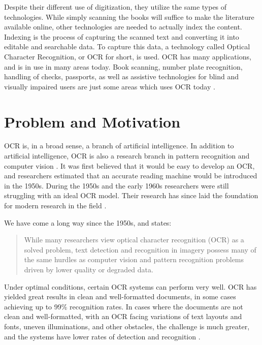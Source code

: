 Despite their different use of digitization, they utilize the same types of technologies. While simply scanning the books will suffice to make the literature available online, other technologies are needed to actually index the content. Indexing is the process of capturing the scanned text and converting it into editable and searchable data. To capture this data, a technology called Optical Character Recognition, or OCR for short, is used. OCR has many applications, and is in use in many areas today. Book scanning, number plate recognition, handling of checks, passports, as well as assistive technologies for blind and visually impaired users are just some areas which uses OCR today \citep{mori1999optical, kurzweil2000reading}.


\section{Problem and Motivation}
\label{sec:problem_motivation}
OCR is, in a broad sense, a branch of artificial intelligence. In addition to artificial intelligence, OCR is also a research branch in pattern recognition and computer vision \citep{mori1999optical}. It was first believed that it would be easy to develop an OCR, and researchers estimated that an accurate reading machine would be introduced in the 1950s. During the 1950s and the early 1960s researchers were still struggling with an ideal OCR model. Their research has since laid the foundation for modern research in the field \citep{mori1992historical}.

We have come a long way since the 1950s, and \citep{ye2015text} states:

\begin{quote}
    While many researchers view optical character recognition (OCR) as a solved problem, text detection and recognition in imagery possess many of the same hurdles as computer vision and pattern recognition problems driven by lower quality or degraded data.
\end{quote}

Under optimal conditions, certain OCR systems can perform very well. OCR has yielded great results in clean and well-formatted documents, in some cases achieving up to 99\% recognition rates. In cases where the documents are not clean and well-formatted, with an OCR facing variations of text layouts and fonts, uneven illuminations, and other obstacles, the challenge is much greater, and the systems have lower rates of detection and recognition \citep{ye2015text}.

